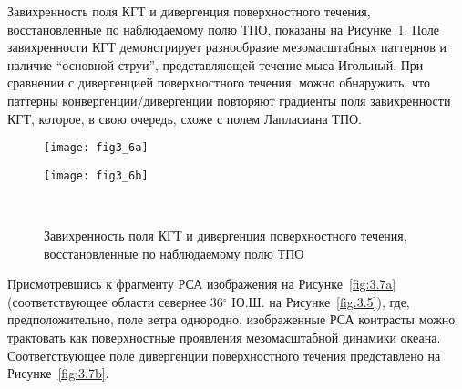 Завихренность поля КГТ и дивергенция поверхностного течения, восстановленные по наблюдаемому полю ТПО, показаны на Рисунке~\ref{fig:3.6}. Поле завихренности КГТ демонстрирует разнообразие мезомасштабных паттернов и наличие ``основной струи'', представляющей течение мыса Игольный. При сравнении с дивергенцией поверхностного течения, можно обнаружить, что паттерны конвергенции/дивергенции повторяют градиенты поля завихренности КГТ, которое, в свою очередь, схоже с полем Лапласиана ТПО.



\begin{figure}[H]
   	\centering
	\begin{minipage}{.47\textwidth}
	    \subcaptionbox{\label{fig:3.6a}}
		{\texttt{[image: fig3\_6a]}}
	\end{minipage}
	\hfill
	\begin{minipage}{.47\textwidth}
	    \subcaptionbox{\label{fig:3.6b}}
		{\texttt{[image: fig3\_6b]}}
	\end{minipage}
    \\
    \caption{Завихренность поля КГТ и дивергенция поверхностного течения, восстановленные по наблюдаемому полю ТПО}
    \label{fig:3.6}
\end{figure}


Присмотревшись к фрагменту РСА изображения на Рисунке~\ref{fig:3.7a} (соответствующее области севернее 36${}^\circ$ Ю.Ш. на Рисунке~\ref{fig:3.5}), где, предположительно, поле ветра однородно, изображенные РСА контрасты можно трактовать как поверхностные проявления мезомасштабной динамики океана. Соответствующее поле дивергенции поверхностного течения представлено на Рисунке~\ref{fig:3.7b}. 



